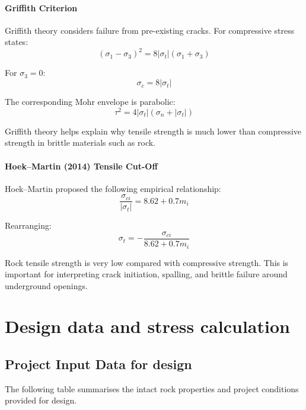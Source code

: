 \paragraph{Griffith Criterion}

Griffith theory considers failure from pre-existing cracks. For compressive stress states:
\[
(\sigma_1-\sigma_3)^2 =
8|\sigma_t|(\sigma_1+\sigma_3)
\]

For \(\sigma_3=0\):
\[
\sigma_c = 8|\sigma_t|
\]

The corresponding Mohr envelope is parabolic:
\[
\tau^2 =
4|\sigma_t|(\sigma_n+|\sigma_t|)
\]

\begin{notebox}
Griffith theory helps explain why tensile strength is much lower than compressive strength
in brittle materials such as rock.
\end{notebox}

\paragraph{Hoek--Martin (2014) Tensile Cut-Off}

Hoek--Martin proposed the following empirical relationship:
\[
\frac{\sigma_{ci}}{|\sigma_t|}
=
8.62 + 0.7m_i
\]

Rearranging:
\[
\sigma_t =
-\frac{\sigma_{ci}}{8.62+0.7m_i}
\]

\begin{warnbox}
Rock tensile strength is very low compared with compressive strength. This is important
for interpreting crack initiation, spalling, and brittle failure around underground openings.
\end{warnbox}

\section{Design data and stress calculation}
\label{sec:design-data-and-stress-calculation}

\subsection{Project Input Data for design}

The following table summarises the intact rock properties and project conditions provided
for design.

